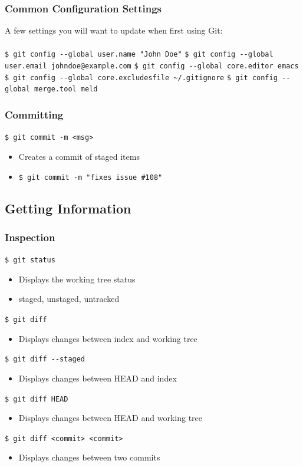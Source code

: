 \documentclass[english,compress]{beamer}
\begin{document}
\begin{frame}[fragile]
    \frametitle{Common Configuration Settings}
	A few settings you will want to update when first using Git:\\ \ \\
	\verb|$ git config --global user.name "John Doe"|
	\verb|$ git config --global user.email johndoe@example.com|
	\verb|$ git config --global core.editor emacs|
	\verb|$ git config --global core.excludesfile ~/.gitignore|
	\verb|$ git config --global merge.tool meld|
\end{frame}

\begin{frame}[fragile]
    \frametitle{Committing}

    \verb|$ git commit -m <msg>|
    \begin{itemize}
        \item Creates a commit of staged items
        \item \verb|$ git commit -m "fixes issue #108"|
    \end{itemize}
\end{frame}

\subsection{Getting Information}
\begin{frame}[fragile]
    \frametitle{Inspection}

    \verb|$ git status|
    \begin{itemize}
        \item Displays the working tree status
        \item staged, unstaged, untracked
    \end{itemize}
    \verb|$ git diff|
    \begin{itemize}
        \item Displays changes between index and working tree
    \end{itemize}
    \verb|$ git diff --staged|
    \begin{itemize}
        \item Displays changes between HEAD and index
    \end{itemize}
    \verb|$ git diff HEAD|
    \begin{itemize}
        \item Displays changes between HEAD and working tree
    \end{itemize}
    \verb|$ git diff <commit> <commit>|
    \begin{itemize}
        \item Displays changes between two commits
    \end{itemize}
\end{frame}
\end{document}
